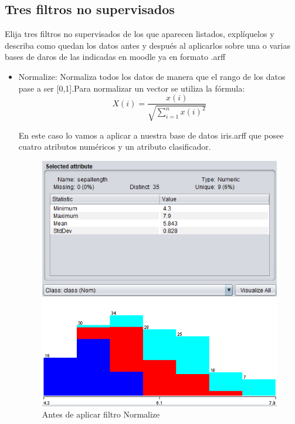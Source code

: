 \subsection{Tres filtros no supervisados}
Elija tres filtros no supervisados de los que aparecen listados, explíquelos y describa como quedan los datos antes y después al aplicarlos sobre una o varias bases de daros de las indicadas en moodle ya en formato .arff
\begin{itemize}
    \item Normalize: Normaliza todos los datos de manera que el rango de los datos pase a ser [0,1].Para normalizar un vector se utiliza la fórmula:
$$ X(i) = \dfrac{x(i)}{ \sqrt{\sum_{i=1}^{n} x(i)^2}} $$

En este caso lo vamos a aplicar a nuestra base de datos iris.arff que posee cuatro atributos numéricos y un atributo clasificador.
\begin{figure}[H]
    \centering
    \includegraphics[width=\textwidth]{img/BN.PNG}
    \caption{Antes de aplicar filtro Normalize}
    
\end{figure}


\end{itemize}
